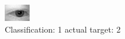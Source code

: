 \begin{figure}[h!]
\begin{center}
\includegraphics[width=0.60\columnwidth]{figures/ID435_class_1_target_2.png}
\end{center}
\caption{ Classification: 1 actual target: 2}
\label{fig:ID435_class_1_target_2}
\end{figure}
